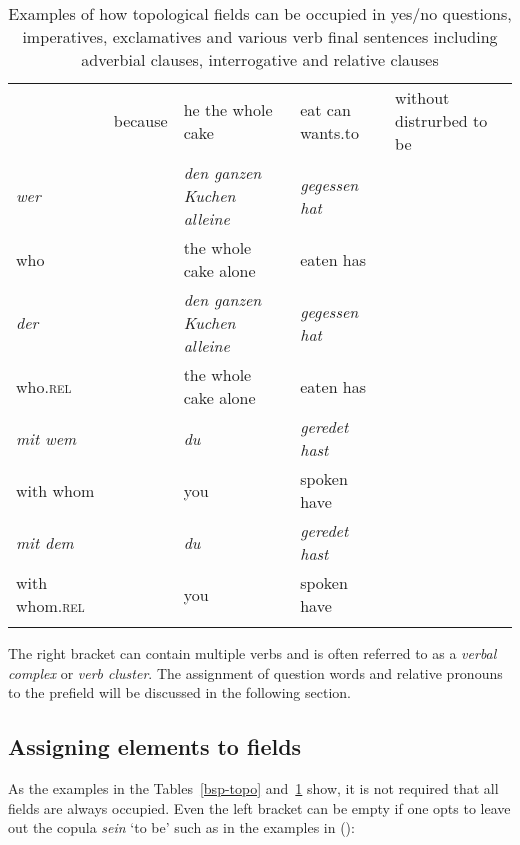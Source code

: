 \begin{table}
{\begin{tabular}{l@{~}l@{~}l@{~}l@{~}l}
        & because       & he the whole cake                 & eat can wants.to    & without distrurbed to be\\\tablevspace
%
\emph{wer}     &               & \emph{den ganzen Kuchen alleine}                  & \emph{gegessen hat} \\
who     &               & the whole cake alone              & eaten has\\\tablevspace
%
\emph{der}     &               & \emph{den ganzen Kuchen alleine}                  & \emph{gegessen hat} \\
who.\textsc{rel}     &               & the whole cake alone              & eaten has\\\tablevspace
%
\emph{mit wem} &               & \emph{du}                                     & \emph{geredet hast}\\
with whom &             & you                                    & spoken have\\\tablevspace
%
\emph{mit dem} &               & \emph{du}                                     & \emph{geredet hast}\\
with whom.\textsc{rel} &             & you                                    & spoken have\\\lspbottomrule
\end{tabular}
}
\caption{\label{bsp-topo-two}Examples of how topological fields can be occupied in yes/no questions,
  imperatives, exclamatives and various verb final sentences including adverbial clauses,
  interrogative and relative clauses}
\end{table}
The right bracket can contain multiple verbs and is often referred to as a \emph{verbal complex} or \emph{verb cluster}.
The assignment of question words and relative pronouns to the prefield will be discussed in the following section.

\subsection{Assigning elements to fields}

As the examples in the Tables~\ref{bsp-topo} and~\ref{bsp-topo-two} show, it is not required that all fields are always occupied. Even the left bracket can be empty if one opts to leave out
the copula \emph{sein} `to be' such as in the examples in ():
\eal
\ex

